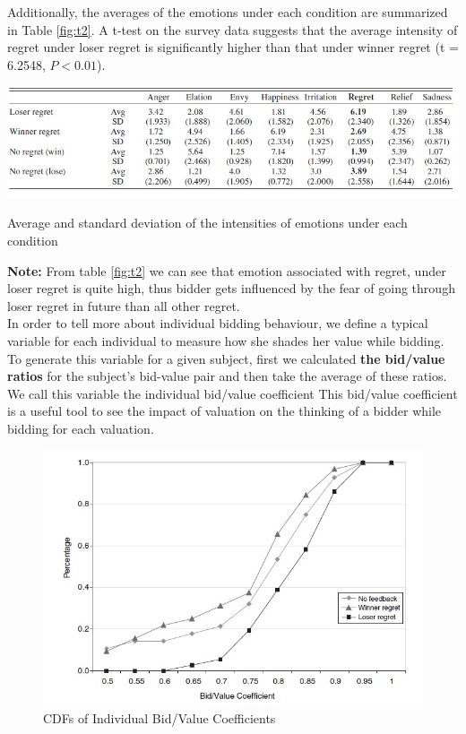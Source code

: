 \documentclass[10pt,a4paper,oneside]{report}
\begin{document}
Additionally, the averages of the emotions under each condition are summarized in Table \ref{fig:t2}. A t-test on the survey data suggests that the average intensity of regret under loser regret is significantly higher than that under winner regret (t = 6.2548, $P<0.01$)\citep{filizy2005auctions}.
\begin{table}[H]
\centering
\includegraphics[scale=0.50]{t3.jpg}
\caption{Average and standard deviation of the intensities of emotions under each condition \citep{filizy2005auctions}}
\label{fig:t2}
\end{table}

\noindent \textbf{Note:} 	From table \ref{fig:t2} we can see that emotion associated with regret, under loser regret is quite high, thus 	bidder gets influenced by the fear of going through loser regret in future than all other regret.\\[2 mm]

\noindent In order to tell more about individual bidding behaviour, we define a typical variable for each individual to measure how she shades her value while bidding. To generate this variable for a given subject, first we calculated \textbf{the bid/value ratios} for the subject’s bid-value pair and then take the average of these ratios. We call this variable the individual bid/value coefficient
This bid/value coefficient is a useful tool to see the impact of valuation on the thinking of a bidder while bidding for each valuation.

\begin{figure}[H]
\centering
\includegraphics[scale=0.7]{t4.jpg}
\caption{CDFs of Individual Bid/Value Coefficients \citep{filizy2005auctions}}
\label{fig:f2}
\end{figure}
\end{document}
